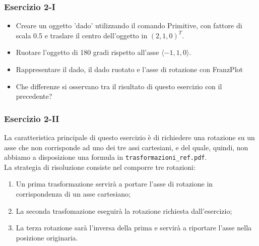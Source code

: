 \documentclass{beamer}
\newcommand{\frnzplt}{FranzPlot }
\begin{document}
\begin{frame}
\frametitle {Esercizio 2-I}
\begin{itemize}
\item Creare un oggetto 'dado' utilizzando il comando Primitive, con fattore di
scala 0.5 e traslare il centro dell'oggetto in   $( 2,1,0)^T$. 
\item Ruotare l'oggetto di 180 gradi rispetto all'asse $\langle -1,1,0 \rangle$.
\item Rappresentare il dado, il dado ruotato e l'asse di rotazione con \frnzplt
\item Che differenze si osservano tra il risultato di questo esercizio con il precedente?

\end{itemize}
\end{frame}
\begin{frame}
\frametitle{ Esercizio 2-II}
La caratteristica principale di questo esercizio \`e di richiedere una
rotazione su un asse che non corrisponde ad uno dei tre assi cartesiani, e del
quale, quindi, non abbiamo a disposizione una formula in
\texttt{trasformazioni\_ref.pdf}.\\ 
La strategia di risoluzione consiste nel
comporre tre rotazioni:
\begin{enumerate}
\item Un prima trasformazione servir\`a a portare l'asse di rotazione in corrispondenza di un asse cartesiano;
\item La seconda trasfomazione eseguir\`a la rotazione richiesta dall'esercizio;
\item La terza rotazione sar\`a l'inversa della prima e servir\`a a riportare l'asse nella posizione originaria.
\end{enumerate}
\end{frame}
\end{document}
